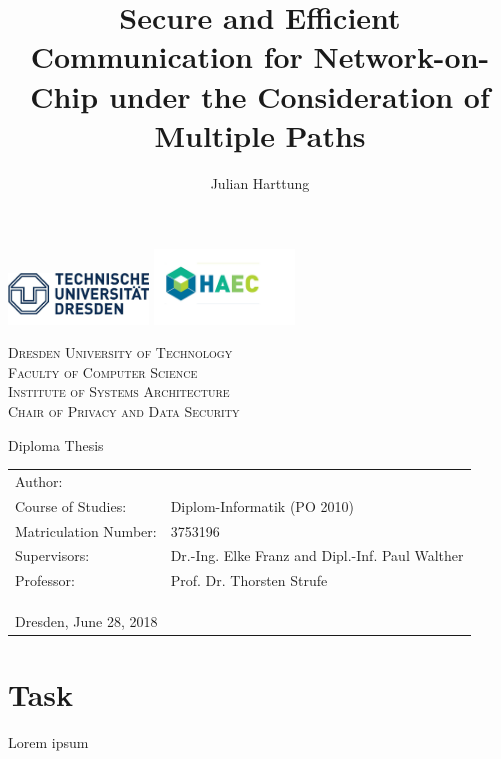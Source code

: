 \documentclass[
	paper=a4,
	fontsize=11pt,
	parskip=full %
]{scrreprt}
\author{Julian Harttung}
\title{Secure and Efficient Communication for Network-on-Chip under the Consideration of Multiple Paths}
\newcommand{\thesubtitle}{Diploma Thesis}
\newcommand{\theuniversity}{Dresden University of Technology}
\newcommand{\thefaculty}{Faculty of Computer Science}
\newcommand{\theinstitute}{Institute of Systems Architecture}
\newcommand{\thechair}{Chair of Privacy and Data Security}
\begin{document}
    \frenchspacing %
	\begin{titlepage}
		\includegraphics[width=0.28\textwidth]{header_logo_tud}
		\hfill
		\includegraphics[width=0.28\textwidth]{header_logo_haec} %
		\vspace{1.5\baselineskip}
		
		\begin{center}
			\textsc{\theuniversity \\
					\thefaculty \\
					\theinstitute \\
					\thechair}
			\vspace{2.5\baselineskip}
		
			\Huge{\thetitle}
			\vspace{.5\baselineskip}
			
			\LARGE{\thesubtitle}
		\end{center}
		
		\vfill
		
		\begin{tabular}{ll}
			Author:               & \theauthor \\
			Course of Studies:    & Diplom-Informatik (PO 2010)\\
			Matriculation Number: & 3753196 \\
			Supervisors:          & Dr.-Ing. Elke Franz and Dipl.-Inf. Paul Walther \\
			Professor:            & Prof. Dr. Thorsten Strufe \\
			\multicolumn{2}{l}{ } \\
			\multicolumn{2}{l}{ } \\
			\multicolumn{2}{l}{ } \\
			\multicolumn{2}{l}{Dresden, June 28, 2018}
		\end{tabular}
	\end{titlepage}
	
	
	
	\chapter*{Task}
    Lorem ipsum
	
\end{document}
